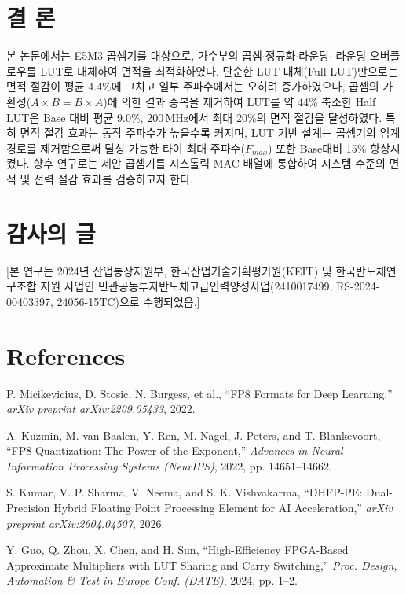\documentclass[10pt,a4paper,twocolumn]{article}
\begin{document}
\section{결 론}
본 논문에서는 E5M3 곱셈기를 대상으로, 가수부의 곱셈$\cdot$정규화$\cdot$라운딩$\cdot$
라운딩 오버플로우를 LUT로 대체하여 면적을 최적화하였다.
단순한 LUT 대체(Full LUT)만으로는 면적 절감이 평균 4.4\%에 그치고
일부 주파수에서는 오히려 증가하였으나, 곱셈의 가환성($A\times B = B\times A$)에
의한 결과 중복을 제거하여 LUT를 약 44\% 축소한 Half LUT은 Base 대비 평균 9.0\%, 200\,MHz에서 최대 20\%의 면적 절감을 달성하였다. 특히 면적 절감 효과는 동작 주파수가 높을수록
커지며, LUT 기반 설계는 곱셈기의 임계 경로를 제거함으로써 달성 가능한 타이
최대 주파수($F_{max}$) 또한 Base대비 15\% 향상시켰다.
향후 연구로는 제안 곱셈기를 시스톨릭 MAC 배열에 통합하여 시스템 수준의 면적 및 전력 절감 효과를 검증하고자 한다.

\section*{감사의 글}
[본 연구는 2024년 산업통상자원부, 한국산업기술기획평가원(KEIT) 및 한국반도체연구조합 지원 사업인 민관공동투자반도체고급인력양성사업(2410017499, RS-2024-00403397, 24056-15TC)으로 수행되었음.]

\section*{References}
\footnotesize
\begin{enumerate}[label={[\arabic*]},leftmargin=*,labelsep=0.5em,itemsep=2pt]
  \item P. Micikevicius, D. Stosic, N. Burgess, et al.,
        ``FP8 Formats for Deep Learning,''
        \textit{arXiv preprint arXiv:2209.05433}, 2022.
  \item A. Kuzmin, M. van Baalen, Y. Ren, M. Nagel, J. Peters, and
        T. Blankevoort, ``FP8 Quantization: The Power of the Exponent,''
        \textit{Advances in Neural Information Processing Systems (NeurIPS)},
        2022, pp. 14651--14662.
  \item S. Kumar, V. P. Sharma, V. Neema, and S. K. Vishvakarma,
        ``DHFP-PE: Dual-Precision Hybrid Floating Point Processing Element
        for AI Acceleration,'' \textit{arXiv preprint arXiv:2604.04507}, 2026.
  \item Y. Guo, Q. Zhou, X. Chen, and H. Sun, ``High-Efficiency
        FPGA-Based Approximate Multipliers with LUT Sharing and Carry
        Switching,'' \textit{Proc. Design, Automation \& Test in Europe
        Conf. (DATE)}, 2024, pp. 1--2.
\end{enumerate}
\end{document}
